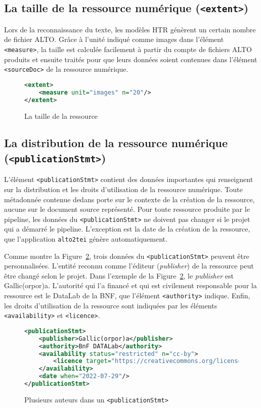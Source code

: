\documentclass[class=article, crop=false]{standalone}
\begin{document}
\subsection{La taille de la ressource numérique (\texttt{<extent>})}
Lors de la reconnaissance du texte, les modèles \acrshort{HTR} génèrent un certain nombre de fichier \acrshort{ALTO}. Grâce à l'unité indiqué comme \og{}images\fg{} dans l'élément \texttt{<measure>}, la taille est calculée facilement à partir du compte de fichiers \acrshort{ALTO} produits et ensuite traités pour que leurs données soient contenues dans l'élément \texttt{<sourceDoc>} de la ressource numérique. 
\begin{figure}[htp]
\centering
\begin{lstlisting}[language=XML]
<extent>
	<measure unit="images" n="20"/>
</extent>
\end{lstlisting}
\caption{La taille de la ressource}
\label{fig:extent}
\end{figure}

\subsection{La distribution de la ressource numérique (\texttt{<publicationStmt>})}
L'élément \texttt{<publicationStmt>} contient des données importantes qui renseignent sur la distribution et les droits d'utilisation de la ressource numérique. Toute métadonnée contenue dedans porte sur le contexte de la création de la ressource, aucune sur le document source représenté. Pour toute ressource produite par le pipeline, les données du \texttt{<publicationStmt>} ne doivent pas changer si le projet qui a démarré le pipeline. L'exception est la date de la création de la ressource, que l'application \texttt{alto2tei} génère automatiquement.

Comme montre la Figure~\ref{fig:pubStmt}, trois données du \texttt{<publicationStmt>} peuvent être personnalisées. L'entité reconnu comme l'éditeur (\textit{publisher}) de la ressource peut être changé selon le projet. Dans l'exemple de la Figure~\ref{fig:pubStmt}, le \textit{publisher} est \og{}Gallic(orpor)a\fg{}. L'autorité qui l'a financé et qui est civilement responsable pour la ressource est le DataLab de la \acrshort{BNF}, que l'élément \texttt{<authority>} indique. Enfin, les droits d'utilisation de la ressource sont indiquées par les éléments \texttt{<availability>} et \texttt{<licence>}.

\begin{figure}[htp]
\centering
\begin{lstlisting}[language=XML]
<publicationStmt>
	<publisher>Gallic(orpor)a</publisher>
	<authority>BnF DATALab</authority>
	<availability status="restricted" n="cc-by">
		<licence target="https://creativecommons.org/licenses/by/4.0/"/>
	</availability>
	<date when="2022-07-29"/>
</publicationStmt>
\end{lstlisting}
\caption{Plusieurs auteurs dans un \texttt{<publicationStmt>}}
\label{fig:pubStmt}
\end{figure}
\end{document}
